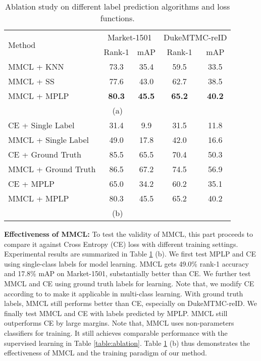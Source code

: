 \documentclass[10pt,twocolumn,letterpaper]{article}
\begin{document}
\begin{table}
\footnotesize
\begin{center}
\begin{tabular}{l||c|c||c|c}
\hline
\multirow{2}{*}{Method} & \multicolumn{2}{c||}{Market-1501} & \multicolumn{2}{c}{DukeMTMC-reID}\\
\cline{2-5}
 & Rank-1 & mAP & Rank-1 & mAP  \\
\hline\hline
MMCL + KNN &73.3 & 35.4 & 59.5 & 33.5 \\
MMCL + SS & 77.6 & 43.0 & 62.7 & 38.5 \\
MMCL + MPLP & \textbf{80.3} & \textbf{45.5} & \textbf{65.2} & \textbf{40.2} \\
\hline
\multicolumn{5}{c}{(a)}\\
\hline
CE + Single Label & 31.4 & 9.9 & 31.5 & 11.8 \\
MMCL + Single Label & 49.0 & 17.8 & 42.0 & 16.6\\
CE + Ground Truth & 85.5 & 65.5 & 70.4 & 50.3 \\
MMCL + Ground Truth & 86.5 & 67.2 & 74.5 & 56.9\\
CE + MPLP & 65.0& 34.2 & 60.2 & 35.1\\
MMCL + MPLP & 80.3 & 45.5 & 65.2 & 40.2 \\
\hline
\multicolumn{5}{c}{(b)}\\
\end{tabular}
\end{center}
\vspace{-2mm}
\caption{Ablation study on different label prediction algorithms and loss functions.}
\vspace{-2mm}
\label{table:labelandloss}
\end{table}

\textbf{Effectiveness of MMCL:} To test the validity of MMCL, this part proceeds to compare it against Cross Entropy (CE) loss with different training settings. Experimental results are summarized in Table \ref{table:labelandloss} (b). We first test MPLP and CE using single-class labels for model learning. MMCL gets 49.0\% rank-1 accuracy and 17.8\% mAP on Market-1501, substantially better than CE. We further test MMCL and CE using ground truth labels for learning. Note that, we modify CE according to \cite{zhong2019invariance} to make it applicable in multi-class learning. With ground truth labels, MMCL still performs better than CE, especially on DukeMTMC-reID. We finally test MMCL and CE with labels predicted by MPLP. MMCL still outperforms CE by large margins. Note that, MMCL uses non-parameters classifiers for training. It still achieves comparable performance with the supervised learning in Table \ref{table:ablation}. Table \ref{table:labelandloss} (b) thus demonstrates the effectiveness of MMCL and the training paradigm of our method.
\end{document}
